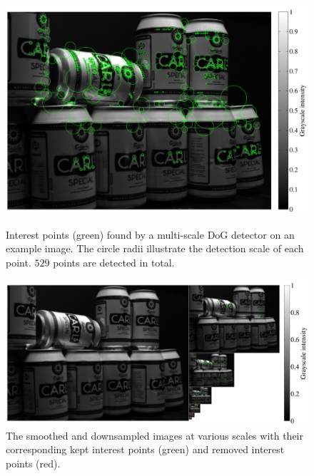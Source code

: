 \documentclass[thesis.tex]{subfiles}
\begin{document}
\begin{figure}[p]
    \centering
    \includegraphics[width=\textwidth]{img/cellHistDetector.pdf}
    \caption{Interest points (green) found by a multi-scale DoG detector on an example image. The circle radii illustrate the detection scale of each point. $529$ points are detected in total.}
    \label{fig:cellHistDetector}
    \vspace{1cm}
    \includegraphics[width=\textwidth]{img/cellHistScaleSpacesP.pdf}
    \caption{The smoothed and downsampled images at various scales with their corresponding kept interest points (green) and removed interest points (red).}
    \label{fig:cellHistScaleSpacesP}
\end{figure}
\end{document}
